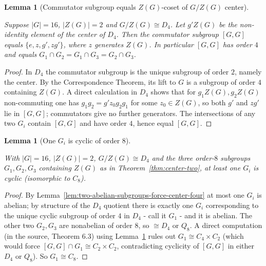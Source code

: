 \documentclass{article}
\newtheorem{lemma}[theorem]{Lemma}
\theoremstyle{definition}
\newcommand{\uses}[1]{}
\begin{document}
\begin{lemma}[Commutator subgroup equals $Z(G)$-coset of $G/Z(G)$ center]
    \label{lem:commutator-equals-centerlift}
    \uses{lem:commutator-in-center-when-quotient-abelian}
    Suppose $|G| = 16$, $|Z(G)| = 2$ and $G/Z(G) \cong D_4$. Let
    $g'Z(G)$ be the non-identity element of the center of $D_4$. Then the
    commutator subgroup $[G,G]$ equals $\{e, z, g', zg'\}$, where $z$
    generates $Z(G)$. In particular $[G,G]$ has order $4$ and equals
    $G_1 \cap G_2 = G_1 \cap G_3 = G_2 \cap G_3$.
\end{lemma}
\begin{proof}
    \uses{lem:commutator-in-center-when-quotient-abelian}
    In $D_4$ the commutator subgroup is the unique subgroup of order $2$,
    namely the center. By the Correspondence Theorem, its lift to $G$ is a
    subgroup of order $4$ containing $Z(G)$. A direct calculation in $D_4$
    shows that for $g_1 Z(G), g_2 Z(G)$ non-commuting one has
    $g_1 g_2 = g' z_0 g_2 g_1$ for some $z_0 \in Z(G)$, so both $g'$ and
    $zg'$ lie in $[G, G]$; commutators give no further generators. The
    intersections of any two $G_i$ contain $[G,G]$ and have order $4$, hence
    equal $[G, G]$.
\end{proof}

\begin{lemma}[One $G_i$ is cyclic of order 8]
    \label{lem:one-Gi-cyclic-order-eight}
    \uses{lem:commutator-equals-centerlift,lem:order-eight-classification}
    With $|G| = 16$, $|Z(G)| = 2$, $G/Z(G) \cong D_4$ and the three
    order-$8$ subgroups $G_1, G_2, G_3$ containing $Z(G)$ as in
    Theorem~\ref{thm:center-two}, at least one $G_i$ is cyclic
    (isomorphic to $C_8$).
\end{lemma}
\begin{proof}
    \uses{lem:commutator-equals-centerlift,lem:order-eight-classification,
          lem:two-abelian-subgroups-force-center-four}
    By Lemma~\ref{lem:two-abelian-subgroups-force-center-four} at most one
    $G_i$ is abelian; by structure of the $D_4$ quotient there is exactly
    one $G_i$ corresponding to the unique cyclic subgroup of order $4$ in
    $D_4$ - call it $G_1$ - and it is abelian. The other two $G_2, G_3$ are
    nonabelian of order $8$, so $\cong D_4$ or $Q_8$. A direct computation
    (in the source, Theorem 6.3) using
    Lemma~\ref{lem:commutator-equals-centerlift} rules out
    $G_1 \cong C_4 \times C_2$ (which would force $[G,G] \cap G_1 \cong
    C_2 \times C_2$, contradicting cyclicity of $[G,G]$ in either $D_4$ or
    $Q_8$). So $G_1 \cong C_8$.
\end{proof}
\end{document}
